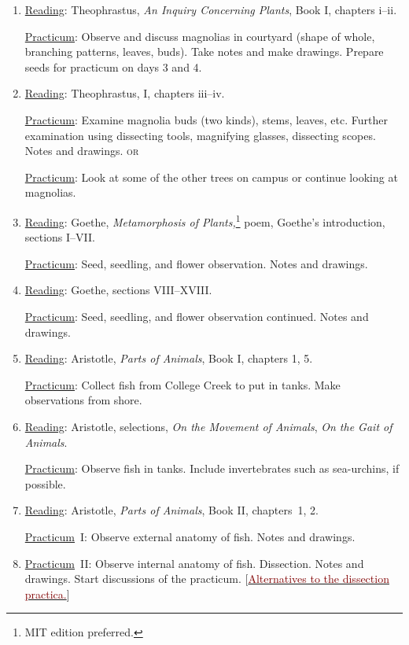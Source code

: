 \documentclass{article}
\newcommand{\rd}{\uline{Reading}}
\newcommand{\pc}{\uline{Practicum}}
\begin{document}
\begin{enumerate}

\item \rd: Theophrastus, \emph{An Inquiry Concerning Plants}, Book I, chapters i--ii.

\pc: Observe and discuss magnolias in courtyard (shape of whole, branching patterns, leaves, buds). Take notes and make drawings. Prepare seeds for practicum on days 3 and 4.

\item \rd: Theophrastus, I, chapters iii--iv.

\pc: Examine magnolia buds (two kinds), stems, leaves, etc. Further examination using dissecting tools, magnifying glasses, dissecting scopes. Notes and drawings. \textsc{or}

\pc: Look at some of the other trees on campus or continue looking at magnolias.

\item \rd: Goethe, \emph{Metamorphosis of Plants,}\footnote{MIT edition preferred.} poem, Goethe’s introduction, sections I--VII.

\pc: Seed, seedling, and flower observation. Notes and drawings.

\item \rd: Goethe, sections VIII--XVIII.

\pc: Seed, seedling, and flower observation continued. Notes and drawings.

\item \rd: Aristotle, \emph{Parts of Animals}, Book I, chapters 1, 5.

\pc: Collect fish from College Creek to put in tanks. Make observations from shore.

\item \rd: Aristotle, selections, \emph{On the Movement of Animals}, \emph{On the Gait of Animals}.

\pc: Observe fish in tanks. Include invertebrates such as sea-urchins, if possible.

\item \rd: Aristotle, \emph{Parts of Animals}, Book II, chapters\ 1, 2.

\pc\ I: Observe external anatomy of fish. Notes and drawings.

\item \pc\ II: Observe internal anatomy of fish. Dissection. Notes and drawings. Start discussions of the practicum. [\href{https://sjca.sharepoint.com/:b:/r/sites/Departments/Faculty/Documents/Annapolis/Freshman\%20Lab/Schedule\%20and\%20files/Alternatives_dissection.pdf?csf=1&web=1&e=HwM1bj}{\textcolor{Maroon}{Alternatives to the dissection practica.}}]


\end{enumerate}
\end{document}
